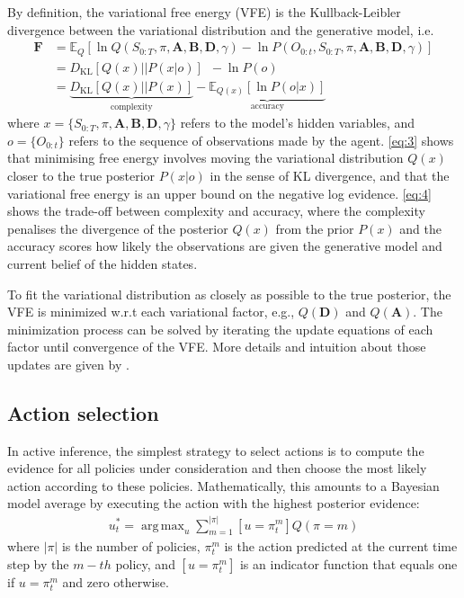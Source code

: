 \documentclass[twoside,11pt]{article}
\newcommand{\kl}[2]{D_{\mathrm{KL}} \left[ \left. \left. #1 \right|\right| #2 \right] }
\DeclareMathOperator*{\argmax}{arg\,max}
\begin{document}
By definition, the variational free energy (VFE) is the Kullback-Leibler divergence between the variational distribution and the generative model, i.e.
\begin{align}
\bm{F} &= \mathbb{E}_{Q}[\ln Q(S_{0:T}, \pi, \bm{A}, \bm{B}, \bm{D}, \gamma) - \ln P(O_{0:t},S_{0:T}, \pi, \bm{A}, \bm{B}, \bm{D}, \gamma)]\\
&= \kl{Q(x)}{P(x|o)} \,\,\, - \ln P(o)\label{eq:3}\\
&= \underbrace{\kl{Q(x)}{P(x)}}_{\text{complexity}} - \underbrace{\mathbb{E}_{Q(x)}[\ln P(o|x)]}_{\text{accuracy}} \label{eq:4}
\end{align}
where $x = \{S_{0:T}, \pi, \bm{A}, \bm{B}, \bm{D}, \gamma\}$ refers to the model's hidden variables, and $o = \{O_{0:t}\}$ refers to the sequence of observations made by the agent. \eqref{eq:3} shows that minimising free energy involves moving the variational distribution $Q(x)$ closer to the true posterior $P(x|o)$ in the sense of KL divergence, and that the variational free energy is an upper bound on the negative log evidence. \eqref{eq:4} shows the trade-off between complexity and accuracy, where the complexity penalises the divergence of the posterior $Q(x)$ from the prior $P(x)$ and the accuracy scores how likely the observations are given the generative model and current belief of the hidden states.

To fit the variational distribution as closely as possible to the true posterior, the VFE is minimized w.r.t each variational factor, e.g., $Q(\bm{D})$ and $Q(\bm{A})$. The minimization process can be solved by iterating the update equations of each factor until convergence of the VFE. More details and intuition about those updates are given by \citet{AI_VMP}.

\subsection{Action selection}

In active inference, the simplest strategy to select actions is to compute the evidence for all policies under consideration and then choose the most likely action according to these policies. Mathematically, this amounts to a Bayesian model average by executing the action with the highest posterior evidence:
\begin{align}
u_t^* = \argmax_{u} \sum_{m = 1}^{|\pi|} [u = \pi^m_t] Q(\pi = m)
\end{align}
where $|\pi|$ is the number of policies, $\pi^m_t$ is the action predicted at the current time step by the $m-th$ policy, and $[u = \pi^m_t]$ is an indicator function that equals one if $u = \pi^m_t$ and zero otherwise.
\end{document}
